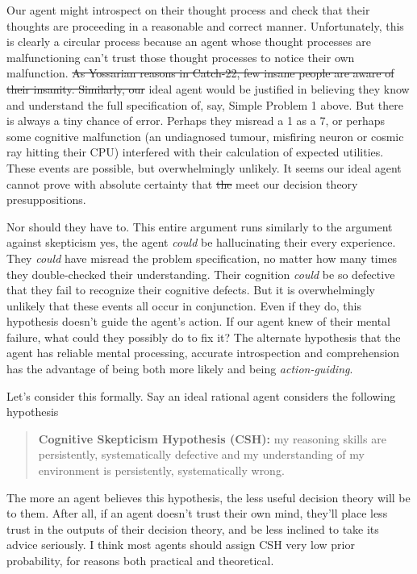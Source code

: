 \documentclass{article}
\providecommand{\DIFadd}[1]{{\protect\color{blue}\uwave{#1}}} %
\providecommand{\DIFdel}[1]{{\protect\color{red}\sout{#1}}}                      %
\providecommand{\DIFaddbegin}{} %
\providecommand{\DIFaddend}{} %
\providecommand{\DIFdelbegin}{} %
\providecommand{\DIFdelend}{} %
\begin{document}
Our agent might introspect on their thought process and check that their thoughts are proceeding in a reasonable and correct manner. Unfortunately, this is clearly a circular process because an agent whose thought processes are malfunctioning can't trust those thought processes to notice their own malfunction. \DIFdelbegin \DIFdel{As Yossarian reasons in Catch-22, few insane people are aware of their insanity. Similarly, our }\DIFdelend \DIFaddbegin \DIFadd{Our }\DIFaddend ideal agent would be justified in believing they know and understand the full specification of, say, Simple Problem 1 above. But there is always a tiny chance of error. Perhaps they misread a 1 as a 7, or perhaps some cognitive malfunction (an undiagnosed tumour, misfiring neuron or cosmic ray hitting their CPU) interfered with their calculation of expected utilities. These events are possible, but overwhelmingly unlikely. It seems our ideal agent cannot prove with absolute certainty that \DIFdelbegin \DIFdel{the }\DIFdelend \DIFaddbegin \DIFadd{they }\DIFaddend meet our decision theory presuppositions.

Nor should they have to. This entire argument runs similarly to the argument against skepticism \textemdash{} yes, the agent \textit{could} be hallucinating their every experience. They \textit{could} have misread the problem specification, no matter how many times they double-checked their understanding. Their cognition \textit{could} be so defective that they fail to recognize their cognitive defects. But it is overwhelmingly unlikely that these events all occur in conjunction. Even if they do, this hypothesis doesn't guide the agent's action. If our agent knew of their mental failure, what could they possibly do to fix it? The alternate hypothesis \textemdash{} that the agent has reliable mental processing, accurate introspection and comprehension \textemdash{} has the advantage of being both more likely and being \textit{action-guiding}. 

Let's consider this formally. Say an ideal rational agent considers the following hypothesis

\begin{quote}
\textbf{Cognitive Skepticism Hypothesis (CSH):} my reasoning skills are persistently, systematically defective and my understanding of my environment is persistently, systematically wrong.
\end{quote}

The more an agent believes this hypothesis, the less useful decision theory will be to them. After all, if an agent doesn't trust their own mind, they'll place less trust in the outputs of their decision theory, and be less inclined to take its advice seriously. I think most agents should assign CSH very low prior probability, for reasons both practical and theoretical.
\end{document}
